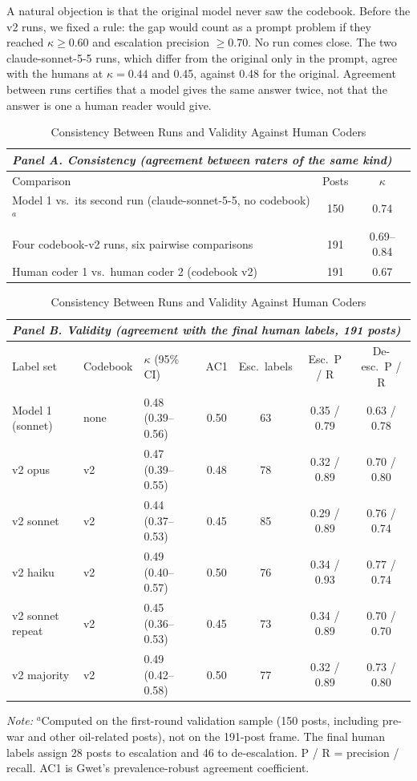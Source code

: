 \documentclass[12pt]{article}
\begin{document}
A natural objection is that the original model never saw the codebook. Before the v2 runs, we fixed a rule: the gap would count as a prompt problem if they reached $\kappa \geq 0.60$ and escalation precision $\geq 0.70$. No run comes close. The two claude-sonnet-5-5 runs, which differ from the original only in the prompt, agree with the humans at $\kappa = 0.44$ and 0.45, against 0.48 for the original. Agreement between runs certifies that a model gives the same answer twice, not that the answer is one a human reader would give.

\begin{table}[t]
\centering
\small
\caption{Consistency Between Runs and Validity Against Human Coders}
\label{tab:agreement}
\begin{tabular}{lcc}
\multicolumn{3}{l}{\textit{Panel A. Consistency (agreement between raters of the same kind)}}\\
\toprule
Comparison & Posts & $\kappa$ \\
\midrule
Model 1 vs.\ its second run (claude-sonnet-5-5, no codebook)$^{a}$ & 150 & 0.74 \\
Four codebook-v2 runs, six pairwise comparisons & 191 & 0.69--0.84 \\
Human coder 1 vs.\ human coder 2 (codebook v2) & 191 & 0.67 \\
\bottomrule
\end{tabular}

\vspace{1em}
\begin{tabular}{lllcccc}
\multicolumn{7}{l}{\textit{Panel B. Validity (agreement with the final human labels, 191 posts)}}\\
\toprule
Label set & Codebook & $\kappa$ (95\% CI) & AC1 & Esc.\ labels & Esc.\ P / R & De-esc.\ P / R \\
\midrule
Model 1 (sonnet) & none & 0.48 (0.39--0.56) & 0.50 & 63 & 0.35 / 0.79 & 0.63 / 0.78 \\
v2 opus & v2 & 0.47 (0.39--0.55) & 0.48 & 78 & 0.32 / 0.89 & 0.70 / 0.80 \\
v2 sonnet & v2 & 0.44 (0.37--0.53) & 0.45 & 85 & 0.29 / 0.89 & 0.76 / 0.74 \\
v2 haiku & v2 & 0.49 (0.40--0.57) & 0.50 & 76 & 0.34 / 0.93 & 0.77 / 0.74 \\
v2 sonnet repeat & v2 & 0.45 (0.36--0.53) & 0.45 & 73 & 0.34 / 0.89 & 0.70 / 0.70 \\
v2 majority & v2 & 0.49 (0.42--0.58) & 0.50 & 77 & 0.32 / 0.89 & 0.73 / 0.80 \\
\bottomrule
\end{tabular}

\vspace{0.5em}
\begin{minipage}{0.95\textwidth}
\footnotesize\textit{Note:} $^{a}$Computed on the first-round validation sample (150 posts, including pre-war and other oil-related posts), not on the 191-post frame. The final human labels assign 28 posts to escalation and 46 to de-escalation. P / R = precision / recall. AC1 is Gwet's prevalence-robust agreement coefficient.
\end{minipage}
\end{table}
\end{document}
